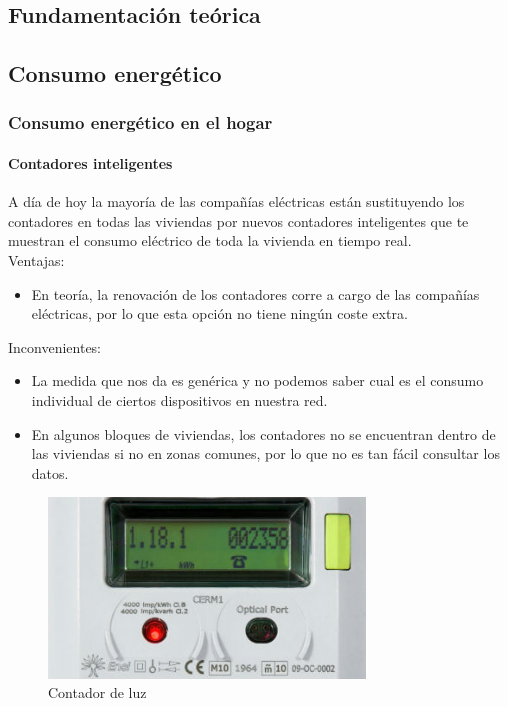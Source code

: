 \begin{titlepage}

\chapter{Fundamentación teórica}
\section{Consumo energético}
\subsection{Consumo energético en el hogar}
\subsubsection{Contadores inteligentes}
A día de hoy la mayoría de las compañías eléctricas están sustituyendo los contadores en todas las viviendas por nuevos contadores inteligentes que te muestran el consumo eléctrico de toda la vivienda en tiempo real.\\

Ventajas:
\begin{itemize}
	\item En teoría, la renovación de los contadores corre a cargo de las compañías eléctricas, por lo que esta opción no tiene ningún coste extra.
\end{itemize}
Inconvenientes:
\begin{itemize}
	\item La medida que nos da es genérica y no podemos saber cual es el consumo individual de ciertos dispositivos en nuestra red.
	\item En algunos bloques de viviendas, los contadores no se encuentran dentro de las viviendas si no en zonas comunes, por lo que no es tan fácil consultar los datos.
\end{itemize}
\begin{figure}[h!]
	\centering
	\includegraphics[width=0.75\textwidth]{imagenes/contador.jpg}
	\caption{Contador de luz\cite{contador_img}}
\end{figure}

\end{titlepage}
